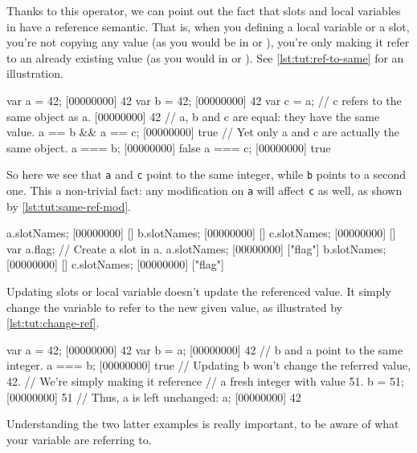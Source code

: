 Thanks to this operator, we can point out the fact that slots and
local variables in \us have a reference semantic. That is, when you
defining a local variable or a slot, you're not copying any value (as
you would be in \C or \Cxx), you're only making it refer to an already
existing value (as you would in \ruby or \java). See \autoref{lst:tut:ref-to-same}
for an illustration.

\begin{urbiscript}[caption=Two references to the same object,
  label=lst:tut:ref-to-same, name=same]
var a = 42;
[00000000] 42
var b = 42;
[00000000] 42
var c = a; // c refers to the same object as a.
[00000000] 42
// a, b and c are equal: they have the same value.
a == b && a == c;
[00000000] true
// Yet only a and c are actually the same object.
a === b;
[00000000] false
a === c;
[00000000] true
\end{urbiscript}

So here we see that \lstinline|a| and \lstinline|c| point to the same
integer, while \lstinline|b| points to a second one. This a
non-trivial fact: any modification on \lstinline|a| will affect
\lstinline|c| as well, as shown by \autoref{lst:tut:same-ref-mod}.

\begin{urbiscript}[caption=Shared modification,
  label=lst:tut:same-ref-mod, name=same]
a.slotNames;
[00000000] []
b.slotNames;
[00000000] []
c.slotNames;
[00000000] []
var a.flag; // Create a slot in a.
a.slotNames;
[00000000] ["flag"]
b.slotNames;
[00000000] []
c.slotNames;
[00000000] ["flag"]
\end{urbiscript}

Updating slots or local variable doesn't update the referenced
value. It simply change the variable to refer to the new given value,
as illustrated by \autoref{lst:tut:change-ref}.

\begin{urbiscript}[caption=Updates just change the referee,
  label=lst:tut:change-ref]
var a = 42;
[00000000] 42
var b = a;
[00000000] 42
// b and a point to the same integer.
a === b;
[00000000] true
// Updating b won't change the referred value, 42.
// We're simply making it reference
// a fresh integer with value 51.
b = 51;
[00000000] 51
// Thus, a is left unchanged:
a;
[00000000] 42
\end{urbiscript}

Understanding the two latter examples is really important, to be aware
of what your variable are referring to.

